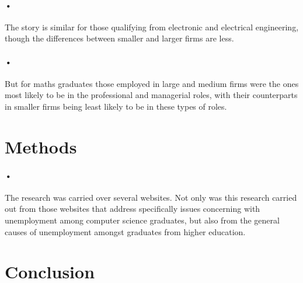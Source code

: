 \documentclass[12pt]{article}
\begin{document}
\paragraph{•}
The story is similar for those qualifying from electronic and electrical engineering, though the differences between smaller and larger firms are less.
\paragraph{•}
But for maths graduates those employed in large and medium firms were the ones most likely to be in the professional and managerial roles, with their counterparts in smaller firms being least likely to be in these types of roles.

\section{Methods}
\paragraph{•}
The research was carried over several websites. Not only was this research carried out from those websites that address specifically issues concerning with unemployment among computer science graduates, but also from the general causes of unemployment amongst graduates from higher education.
\section{Conclusion}
\end{document}
